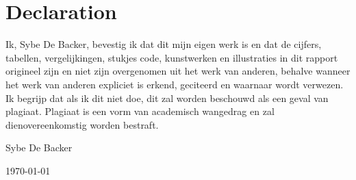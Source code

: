 \newpage
    \thispagestyle{empty}
    \chapter*{\Large Declaration}
    Ik,
     Sybe De Backer, %
    bevestig ik dat dit mijn eigen werk is en dat de cijfers, tabellen, vergelijkingen, stukjes code, kunstwerken en illustraties in dit rapport origineel zijn en niet zijn overgenomen uit het werk van anderen, behalve wanneer het werk van anderen expliciet is erkend, geciteerd en waarnaar wordt verwezen. Ik begrijp dat als ik dit niet doe, dit zal worden beschouwd als een geval van plagiaat. Plagiaat is een vorm van academisch wangedrag en zal dienovereenkomstig worden bestraft. \\
    
    \begin{flushright}
	Sybe De Backer %
    
    \today
    \end{flushright}
